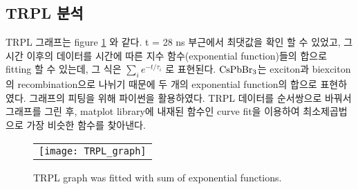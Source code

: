 \subsection{TRPL 분석}
TRPL 그래프는 figure \ref{fig:FIR105} 와 같다. t = 28 ns 부근에서 최댓값을 확인 할 수 있었고, 그 시간 이후의 데이터를 시간에 따른 지수 함수(exponential function)들의 합으로 fitting 할 수 있는데, 그 식은 $\sum_{i}^{} {e}^{-t/{\tau}_{i}}$ 로 표현된다. $\rm{CsPbBr_3}$는 exciton과 biexciton의 recombination으로 나뉘기 때문에 두 개의 exponential function의 합으로 표현하였다. 그래프의 피팅을 위해 파이썬을 활용하였다. TRPL 데이터를 순서쌍으로 바꿔서 그래프를 그린 후, matplot library에 내재된 함수인 curve fit을 이용하여 최소제곱법으로 가장 비슷한 함수를 찾아낸다.
\begin{figure}[h]
	\begin{center}
		\begin{tabular}{c}
			\texttt{[image: TRPL\_graph]}
		\end{tabular}
		\caption{TRPL graph was fitted with sum of exponential functions.}	
		\label{fig:FIR105}
	\end{center}
\end{figure}

